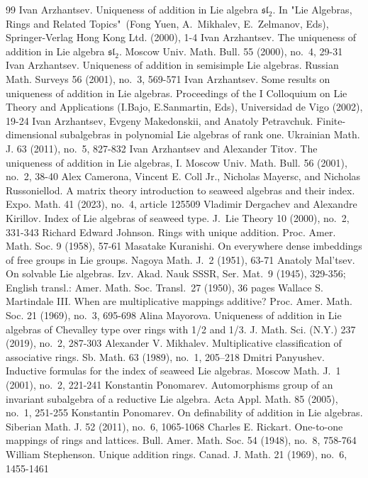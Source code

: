 \documentclass[a4paper,draft,reqno,12pt]{amsart}
\theoremstyle{definition}
\theoremstyle{remark}
\begin{document}
\begin{thebibliography}{99}
%
Ivan Arzhantsev. Uniqueness of addition in Lie algebra $\mathfrak{sl}_2$. In "Lie Algebras, Rings and Related Topics"\ (Fong Yuen, A.~Mikhalev, E.~Zelmanov, Eds), Springer-Verlag Hong Kong Ltd. (2000), 1-4 
%
Ivan Arzhantsev. The uniqueness of addition in Lie algebra $\mathfrak{sl}_2$. Moscow Univ. Math. Bull. 55 (2000), no.~4, 29-31
%
Ivan Arzhantsev. Uniqueness of addition in semisimple Lie algebras. Russian Math. Surveys 56 (2001), no.~3, 569-571
%
Ivan Arzhantsev. Some results on uniqueness of addition in Lie algebras. Proceedings of the I Colloquium on Lie Theory and Applications (I.Bajo, E.Sanmartin, Eds), Universidad de Vigo (2002), 19-24
%
Ivan Arzhantsev, Evgeny Makedonskii, and Anatoly Petravchuk. Finite-dimensional subalgebras in polynomial Lie algebras of rank one. Ukrainian Math. J. 63 (2011), no.~5, 827-832 
%
Ivan Arzhantsev and Alexander Titov. The uniqueness of addition in Lie algebras, I. Moscow Univ. Math. Bull. 56 (2001), no.~2, 38-40
%
Alex Camerona, Vincent E. Coll Jr., Nicholas Mayersc, and Nicholas Russoniellod. A matrix theory introduction to seaweed algebras and their index. Expo. Math. 41 (2023), no.~4, article 125509
%
Vladimir Dergachev and Alexandre Kirillov. Index of Lie algebras of seaweed type. J.~Lie Theory 10 (2000), no.~2, 331-343
%
Richard Edward Johnson. Rings with unique addition. Proc. Amer. Math. Soc. 9 (1958), 57-61
%
Masatake Kuranishi. On everywhere dense imbeddings of free groups in Lie groups. Nagoya Math. J.~2 (1951), 63-71
%
Anatoly Mal'tsev. On solvable Lie algebras. Izv. Akad. Nauk SSSR, Ser. Mat.~9 (1945), 329-356; English transl.: Amer. Math. Soc. Transl.~27 (1950), 36 pages
%
Wallace S. Martindale III. When are multiplicative mappings additive? Proc. Amer. Math. Soc. 21 (1969), no.~3, 695-698
%
Alina Mayorova. Uniqueness of addition in Lie algebras of Chevalley type over rings with 1/2 and 1/3.  J. Math. Sci. (N.Y.) 237 (2019), no.~2, 287-303 
%
Alexander V. Mikhalev. Multiplicative classification of associative rings. Sb. Math. 63 (1989), no.~1, 205--218 
%
Dmitri Panyushev. Inductive formulas for the index of seaweed Lie algebras. Moscow Math. J.~1 (2001), no.~2, 221-241
%
Konstantin Ponomarev. Automorphisms group of an invariant subalgebra of a reductive Lie algebra. Acta Appl. Math. 85 (2005), no.~1, 251-255
%
Konstantin Ponomarev. On definability of addition in Lie algebras. Siberian Math. J. 52 (2011), no.~6, 1065-1068
%
Charles E. Rickart. One-to-one mappings of rings and lattices. Bull. Amer. Math. Soc. 54 (1948), no.~8, 758-764
%
William Stephenson. Unique addition rings. Canad. J. Math. 21 (1969), no.~6, 1455-1461 
%
\end{thebibliography}
\end{document}
